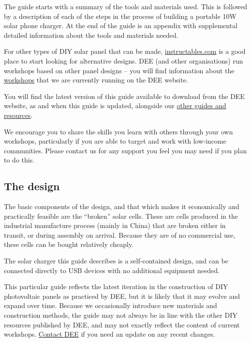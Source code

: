 \documentclass{article}
\theoremstyle{definition}
\theoremstyle{definition}
\theoremstyle{remark}
\begin{document}
    The guide starts with a summary of the tools and materials used. This is followed by a description of each of the steps in the process of building a portable 10W solar phone charger. At the end of the guide is an appendix with supplemental detailed information about the tools and materials needed. 

    For other types of DIY solar panel that can be made, \href{https://www.instructables.com/}{instructables.com} is a good place to start looking for alternative designs. DEE (and other organisations) run workshops based on other panel designs – you will find information about the \href{https://www.demandenergyequality.org/our-workshops/}{workshops} that we are currently running on the DEE website. 

    You will find the latest version of this guide available to download from the DEE website, as and when this guide is updated, alongside our \href{https://www.demandenergyequality.org/resources/}{other guides and resources}. 

    We encourage you to share the skills you learn with others through your own workshops, particularly if you are able to target and work with low-income communities. Please contact us for any support you feel you may need if you plan to do this.


  {\color{blue}\subsection{The design}} %
  \label{ssub:the_design}

    The basic components of the design, and that which makes it economically and practically feasible are the “broken” solar cells. These are cells produced in the industrial manufacture process (mainly in China) that are broken either in transit, or during assembly on arrival. Because they are of no commercial use, these cells can be bought relatively cheaply.

    The solar charger this guide describes is a self-contained design, and can be connected directly to USB devices with no additional equipment needed. 

    This particular guide reflects the latest iteration in the construction of DIY photovoltaic panels as practiced by DEE, but it is likely that it may evolve and expand over time. Because we occasionally introduce new materials and construction methods, the guide may not always be in line with the other DIY resources published by DEE, and may not exactly reflect the content of current workshops. \href{https://www.demandenergyequality.org/contact-us}{Contact DEE} if you need an update on any recent changes. 
  
\end{document}
